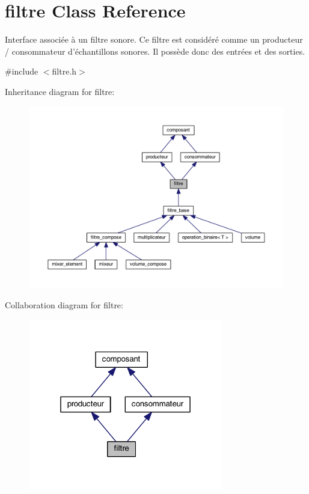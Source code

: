 \hypertarget{classfiltre}{\section{filtre Class Reference}
\label{classfiltre}
}


Interface associée à un filtre sonore. Ce filtre est considéré comme un producteur / consommateur d'échantillons sonores. Il possède donc des entrées et des sorties.  




{\ttfamily \#include $<$filtre.\-h$>$}



Inheritance diagram for filtre\-:
\nopagebreak
\begin{figure}[H]
\begin{center}
\leavevmode
\includegraphics[width=350pt]{classfiltre__inherit__graph}
\end{center}
\end{figure}


Collaboration diagram for filtre\-:
\nopagebreak
\begin{figure}[H]
\begin{center}
\leavevmode
\includegraphics[width=241pt]{classfiltre__coll__graph}
\end{center}
\end{figure}
